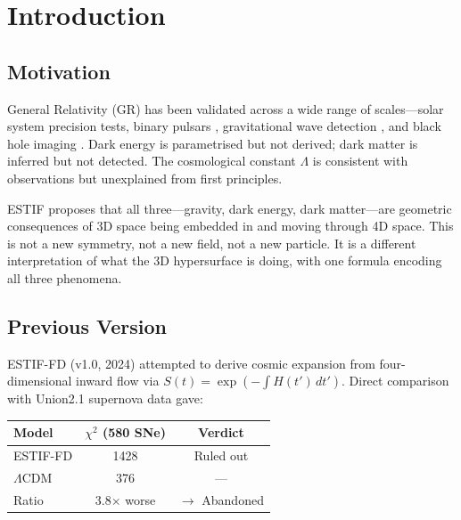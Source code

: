 \documentclass[12pt]{article}
\begin{document}
\begin{abstract}
The dark energy sector $\Omega_\text{tilt}(z)$ was tested against DESI DR2 BAO data
\cite{DESI2025} and found to fail ($\chi^2/N = 10.8$, DESI DR2 $w_0 = -0.73 \pm 0.10$
vs prediction $w_\text{eff} \approx -−1.358$, 3.5$\sigma$ tension). The cosmological sector
requires revision; the gravity sector results are independent and unaffected.

N-body simulation is required for galactic halo structure (collaboration target).

Code: \url{https://github.com/tervion/estif-publication}
\end{abstract}


\section{Introduction}

\subsection{Motivation}

General Relativity (GR) has been validated across a wide range of scales---solar system
precision tests, binary pulsars \cite{Will2014}, gravitational wave detection
\cite{Abbott2016}, and black hole imaging \cite{EHT2019}. Dark energy is parametrised
but not derived; dark matter is inferred but not detected. The cosmological constant
$\Lambda$ is consistent with observations but unexplained from first principles.

ESTIF proposes that all three---gravity, dark energy, dark matter---are geometric
consequences of 3D space being embedded in and moving through 4D space. This is
not a new symmetry, not a new field, not a new particle. It is a different interpretation
of what the 3D hypersurface is doing, with one formula encoding all three phenomena.

\subsection{Previous Version}

ESTIF-FD (v1.0, 2024) attempted to derive cosmic expansion from four-dimensional
inward flow via $S(t) = \exp(-\int H(t')\,dt')$. Direct comparison with Union2.1
supernova data gave:

\begin{center}
\begin{tabular}{lcc}
\toprule
Model & $\chi^2$ (580 SNe) & Verdict \\
\midrule
ESTIF-FD & 1428 & Ruled out \\
$\Lambda$CDM & 376 & --- \\
Ratio & 3.8$\times$ worse & $\longrightarrow$ Abandoned \\
\bottomrule
\end{tabular}
\end{center}
\end{document}
